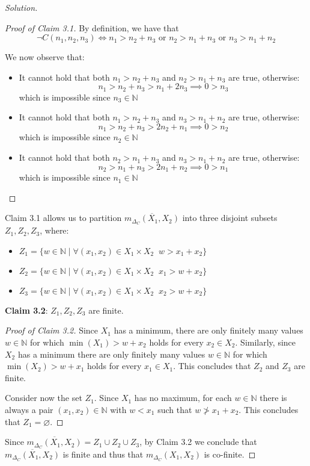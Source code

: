 \documentclass[12pt,a4paper]{report}
\theoremstyle{definition}
\newcommand{\N}{\mathbb{N}}                     %
\begin{document}
\begin{proof}[Solution]
        \begin{proof}[Proof of Claim 3.1]
            By definition, we have that
            \[\lnot C(n_1, n_2, n_3) \iff n_1 > n_2 + n_3 \text{ or } n_2 > n_1 + n_3 \text{ or } n_3 > n_1 + n_2\]

            We now observe that:
            \begin{itemize}
                \item It cannot hold that both $n_1 > n_2 + n_3$ and $n_2 > n_1 + n_3$ are true, otherwise:
                \[n_1 > n_2 + n_3 > n_1 + 2n_3 \implies 0 > n_3\]
                which is impossible since $n_3 \in \N$
                
                \item It cannot hold that both $n_1 > n_2 + n_3$ and $n_3 > n_1 + n_2$ are true, otherwise:
                \[n_1 > n_2 + n_3 > 2n_2 + n_1 \implies 0 > n_2\]
                which is impossible since $n_2 \in \N$

                \item It cannot hold that both $n_2 > n_1 + n_3$ and $n_3 > n_1 + n_2$ are true, otherwise:
                \[n_2 > n_1 + n_3 > 2n_1 + n_2 \implies 0 > n_1\]
                which is impossible since $n_1 \in \N$
            \end{itemize}
        \end{proof}
        
        Claim 3.1 allows us to partition $\overline{m_{\Delta_{C}}(X_1, X_2)}$ into three disjoint subsets $Z_1, Z_2, Z_3$, where:
        \begin{itemize}
            \item $Z_1 = \{w \in \N \mid \forall (x_1,x_2) \in X_1 \times X_2 \;\; w > x_1 + x_2\}$
            \item $Z_2 = \{w \in \N \mid \forall (x_1,x_2) \in X_1 \times X_2 \;\; x_1 > w + x_2\}$
            \item $Z_3 = \{w \in \N \mid \forall (x_1,x_2) \in X_1 \times X_2 \;\; x_2 > w + x_2\}$
        \end{itemize}

        \textbf{Claim 3.2}: $Z_1, Z_2, Z_3$ are finite.

        \begin{proof}[Proof of Claim 3.2]
            Since $X_1$ has a minimum, there are only finitely many values $w \in \N$ for which $\min(X_1) > w + x_2$ holds for every $x_2 \in X_2$. Similarly, since $X_2$ has a minimum there are only finitely many values $w \in \N$ for which $\min(X_2) > w + x_1$ holds for every $x_1 \in X_1$. This concludes that $Z_2$ and $Z_3$ are finite.

            Consider now the set $Z_1$. Since $X_1$ has no maximum, for each $w \in \N$ there is always a pair $(x_1, x_2) \in \N$ with $w < x_1$ such that $w \not > x_1 + x_2$. This concludes that $Z_1 = \varnothing$.
        \end{proof}

        Since $\overline{m_{\Delta_{C}}(X_1, X_2)} = Z_1 \cup Z_2 \cup Z_3$, by Claim 3.2 we conclude that $\overline{m_{\Delta_{C}}(X_1, X_2)}$ is finite and thus that $m_{\Delta_{C}}(X_1, X_2)$ is co-finite.
    \end{proof}
\end{document}
